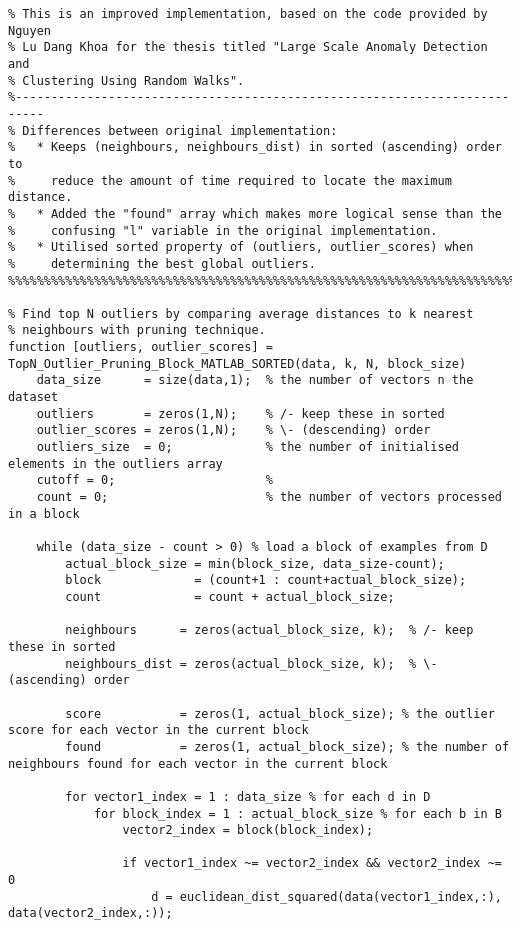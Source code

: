 \lstset{language=Matlab}
\begin{lstlisting}
% This is an improved implementation, based on the code provided by Nguyen
% Lu Dang Khoa for the thesis titled "Large Scale Anomaly Detection and
% Clustering Using Random Walks".
%--------------------------------------------------------------------------
% Differences between original implementation:
%   * Keeps (neighbours, neighbours_dist) in sorted (ascending) order to
%     reduce the amount of time required to locate the maximum distance.
%   * Added the "found" array which makes more logical sense than the
%     confusing "l" variable in the original implementation.
%   * Utilised sorted property of (outliers, outlier_scores) when
%     determining the best global outliers.
%%%%%%%%%%%%%%%%%%%%%%%%%%%%%%%%%%%%%%%%%%%%%%%%%%%%%%%%%%%%%%%%%%%%%%%%%%%

% Find top N outliers by comparing average distances to k nearest
% neighbours with pruning technique.
function [outliers, outlier_scores] = TopN_Outlier_Pruning_Block_MATLAB_SORTED(data, k, N, block_size)
    data_size      = size(data,1);  % the number of vectors n the dataset
    outliers       = zeros(1,N);    % /- keep these in sorted
    outlier_scores = zeros(1,N);    % \- (descending) order
    outliers_size  = 0;             % the number of initialised elements in the outliers array
    cutoff = 0;                     %
    count = 0;                      % the number of vectors processed in a block

    while (data_size - count > 0) % load a block of examples from D
        actual_block_size = min(block_size, data_size-count);
        block             = (count+1 : count+actual_block_size);
        count             = count + actual_block_size;

        neighbours      = zeros(actual_block_size, k);  % /- keep these in sorted
        neighbours_dist = zeros(actual_block_size, k);  % \- (ascending) order

        score           = zeros(1, actual_block_size); % the outlier score for each vector in the current block
        found           = zeros(1, actual_block_size); % the number of neighbours found for each vector in the current block

        for vector1_index = 1 : data_size % for each d in D
            for block_index = 1 : actual_block_size % for each b in B
                vector2_index = block(block_index);

                if vector1_index ~= vector2_index && vector2_index ~= 0
                    d = euclidean_dist_squared(data(vector1_index,:), data(vector2_index,:));


\end{lstlisting}
